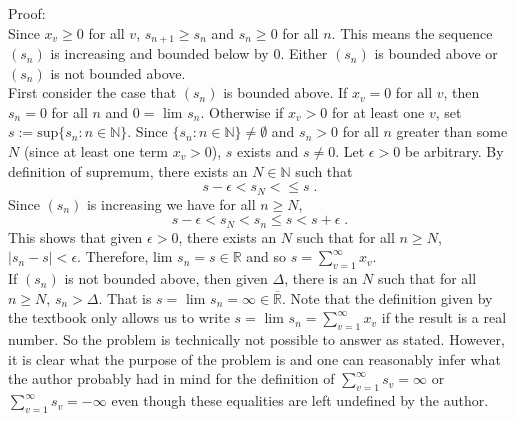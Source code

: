 \documentclass[a4paper]{article}
\begin{document}
Proof:\\

Since $x_v \geq 0$ for all $v$, $s_{n+1} \geq s_n$  and $s_n \geq 0$ for all $n$. This means the sequence $(s_n)$ is increasing and bounded below by 0. Either $(s_n)$ is bounded above or $(s_n)$ is not bounded above.\\

First consider the case that $(s_n)$ is bounded above. If $x_v = 0$ for all $v$, then $s_n = 0$ for all $n$ and $0 = $ lim $s_n$. Otherwise if $x_v >0$ for at least one $v$, set $s := \text{sup}\{s_n : n \in \mathbb{N}\}$. Since $\{s_n : n \in \mathbb{N}\} \neq \emptyset$ and $s_n > 0$ for all $n$ greater than some $N$ (since at least one term $x_v >0$), $s$ exists and $s \neq 0$. Let $\epsilon > 0$ be arbitrary. By definition of supremum, there exists an $N \in \mathbb{N}$ such that $$s - \epsilon < s_N <\leq s \;.$$
Since $(s_n)$ is increasing we have for all $n\geq N$,
$$ s-\epsilon < s_N < s_n \leq s < s+\epsilon \;.$$
This shows that given $\epsilon >0$, there exists an $N$ such that for all $n\geq N$, $|s_n - s| < \epsilon$. Therefore, lim $s_n = s \in \mathbb{R}$ and so $s = \sum_{v = 1}^\infty x_v$. \\

If $(s_n)$ is not bounded above, then given $\Delta$, there is an $N$ such that for all $n\geq N$, $s_n > \Delta$. That is $s = $ lim $s_n = \infty \in \overline{\mathbb{R}}$. Note that the definition given by the textbook only allows us to write $s = $ lim $s_n = \sum_{v=1}^\infty x_v$ if the result is a real number. So the problem is technically not possible to answer as stated. However, it is clear what the purpose of the problem is and one can reasonably infer what the author probably had in mind for the definition of $\sum_{v=1}^\infty s_v = \infty$ or $\sum_{v=1}^\infty s_v = -\infty$ even though these equalities are left undefined by the author. 
\end{document}

